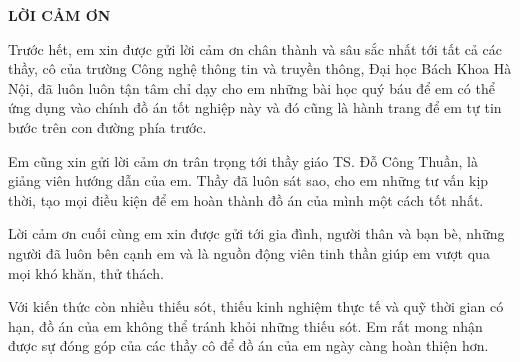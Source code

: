 \documentclass[../DoAn.tex]{subfiles}
\begin{document}
\begin{center}
    \Large{\textbf{LỜI CẢM ƠN}}\\
\end{center}
\vspace{1cm}
Trước hết, em xin được gửi lời cảm ơn chân thành và sâu sắc nhất tới tất cả các thầy, cô của trường Công nghệ thông tin và truyền thông, Đại học Bách Khoa Hà Nội, đã luôn luôn tận tâm chỉ dạy cho em những bài học quý báu để em có thể ứng dụng vào chính đồ án tốt nghiệp này và đó cũng là hành trang để em tự tin bước trên con đường phía trước.

Em cũng xin gửi lời cảm ơn trân trọng tới thầy giáo TS. Đỗ Công Thuần, là giảng viên hướng dẫn của em. Thầy đã luôn sát sao, cho em những tư vấn kịp thời, tạo mọi điều kiện để em hoàn thành đồ án của mình một cách tốt nhất.

Lời cảm ơn cuối cùng em xin được gửi tới gia đình, người thân và bạn bè, những người đã luôn bên cạnh em và là nguồn động viên tinh thần giúp em vượt qua mọi khó khăn, thử thách.

Với kiến thức còn nhiều thiếu sót, thiếu kinh nghiệm thực tế và quỹ thời gian có hạn, đồ án của em không thể tránh khỏi những thiếu sót. Em rất mong nhận được sự đóng góp của các thầy cô để đồ án của em ngày càng hoàn thiện hơn.
\end{document}
